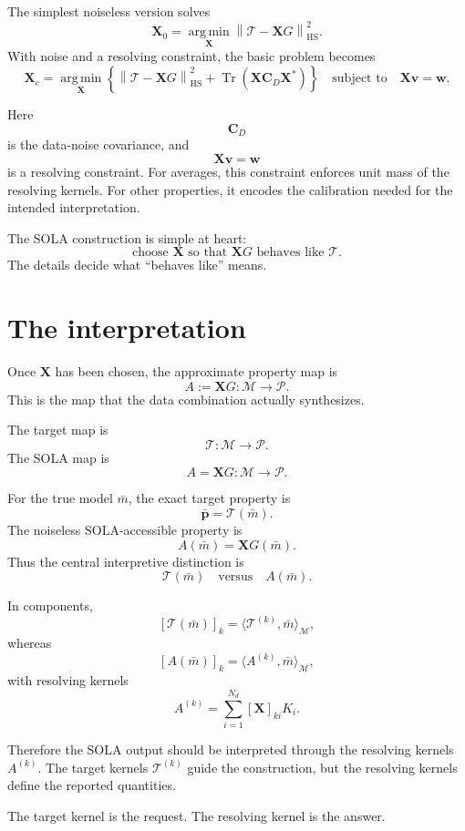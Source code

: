\documentclass[11pt,openany]{book}
\theoremstyle{definition}
\theoremstyle{remark}
\newcommand{\M}{\mathcal M}
\newcommand{\Pspace}{\mathcal P}
\newcommand{\Tau}{\mathcal{T}}
\newcommand{\Tr}{\operatorname{Tr}}
\newcommand{\HS}{\mathrm{HS}}
\newcommand{\argmin}{\operatorname*{arg\,min}}
\begin{document}
The simplest noiseless version solves
\[
  \mathbf X_0
  =
  \argmin_{\mathbf X}
  \left\|
    \Tau-\mathbf XG
  \right\|_{\HS}^2.
\]
With noise and a resolving constraint, the basic problem becomes
\[
  \mathbf X_c
  =
  \argmin_{\mathbf X}
  \left\{
    \left\|
      \Tau-\mathbf XG
    \right\|_{\HS}^2
    +
    \Tr(\mathbf X\mathbf C_D\mathbf X^*)
  \right\}
  \quad
  \text{subject to}
  \quad
  \mathbf X\mathbf v=\mathbf w.
\]

Here
\[
  \mathbf C_D
\]
is the data-noise covariance, and
\[
  \mathbf X\mathbf v=\mathbf w
\]
is a resolving constraint. For averages, this constraint enforces unit mass of the resolving
kernels. For other properties, it encodes the calibration needed for the intended interpretation.

\begin{lessonbox}
The SOLA construction is simple at heart:
\[
  \text{choose }\mathbf X\text{ so that }\mathbf XG\text{ behaves like }\Tau.
\]
The details decide what ``behaves like'' means.
\end{lessonbox}

\section{The interpretation}

Once \(\mathbf X\) has been chosen, the approximate property map is
\[
  A:=\mathbf XG:\M\to\Pspace.
\]
This is the map that the data combination actually synthesizes.

The target map is
\[
  \Tau:\M\to\Pspace.
\]
The SOLA map is
\[
  A=\mathbf XG:\M\to\Pspace.
\]

For the true model \(\bar m\), the exact target property is
\[
  \bar{\mathbf p}
  =
  \Tau(\bar m).
\]
The noiseless SOLA-accessible property is
\[
  A(\bar m)
  =
  \mathbf XG(\bar m).
\]
Thus the central interpretive distinction is
\[
  \Tau(\bar m)
  \quad\text{versus}\quad
  A(\bar m).
\]

In components,
\[
  [\Tau(\bar m)]_k
  =
  \langle \mathcal T^{(k)},\bar m\rangle_{\M},
\]
whereas
\[
  [A(\bar m)]_k
  =
  \langle A^{(k)},\bar m\rangle_{\M},
\]
with resolving kernels
\[
  A^{(k)}
  =
  \sum_{i=1}^{N_d}
  [\mathbf X]_{ki}K_i.
\]

Therefore the SOLA output should be interpreted through the resolving kernels \(A^{(k)}\). The
target kernels \(\mathcal T^{(k)}\) guide the construction, but the resolving kernels define the
reported quantities.

\begin{checkpointbox}
The target kernel is the request. The resolving kernel is the answer.
\end{checkpointbox}
\end{document}
